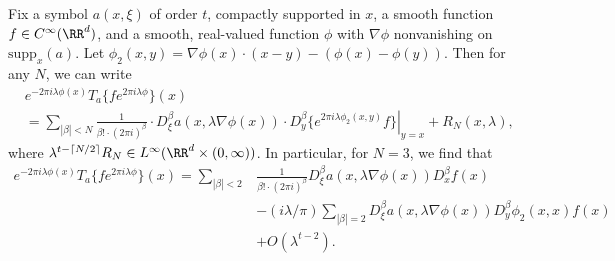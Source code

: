\begin{theorem}
    Fix a symbol $a(x,\xi)$ of order $t$, compactly supported in $x$, a smooth function $f \in C^\infty(\RR^d)$, and a smooth, real-valued function $\phi$ with $\nabla \phi$ nonvanishing on $\text{supp}_x(a)$. Let $\phi_2(x,y) = \nabla \phi(x) \cdot (x - y) - (\phi(x) - \phi(y))$. Then for any $N$, we can write
    \begin{align*}
        & e^{-2 \pi i \lambda \phi(x)} T_a \{ f e^{2 \pi i \lambda \phi} \}(x)\\
        &= \sum_{|\beta| < N} \frac{1}{\beta! \cdot (2 \pi i)^{\beta}} \cdot D_\xi^\beta a(x,\lambda \nabla \phi(x)) \cdot \left. D^\beta_y \{ e^{2 \pi i \lambda \phi_2(x,y)} f \} \right|_{y = x} + R_N(x,\lambda),
    \end{align*}
    where $\lambda^{t - \lceil N/2 \rceil} R_N \in L^\infty(\RR^d \times (0,\infty))$. In particular, for $N = 3$, %
    we find that
    \begin{align*}
        e^{-2 \pi i \lambda \phi(x)} T_a \{ f e^{2 \pi i \lambda \phi} \}(x) = \sum_{|\beta| < 2} &\frac{1}{\beta! \cdot (2 \pi i)^\beta} D_\xi^\beta a(x, \lambda \nabla \phi(x)) D^\beta_x f(x)\\
        &- (i \lambda/\pi) \sum_{|\beta| = 2} D^\beta_\xi a(x, \lambda \nabla \phi(x)) D^\beta_y \phi_2(x,x) f(x)\\
        &+ O(\lambda^{t - 2}).
    \end{align*}
\end{theorem}

